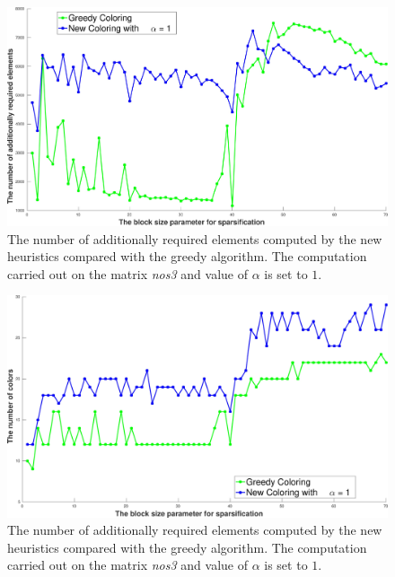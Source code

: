 \documentclass[12pt, oneside]{book}
\begin{document}
\begin{figure}
\centering
\includegraphics[width=0.9\linewidth]{bls_add_alpha_1_nos3}
\caption{The number of additionally required elements computed 
by the new heuristics compared with the 
greedy algorithm. The computation carried out on the matrix 
\textit{nos3} and value of $\alpha$ is 
set to $1$.}
\label{new.col.add.alpha.one.nos3}
\end{figure}
\begin{figure}
\centering
\includegraphics[width=0.9\linewidth]{bls_col_alpha_1_nos3}
\caption{The number of additionally required elements computed 
by the new heuristics compared with the greedy algorithm. 
The computation carried out on the matrix \textit{nos3} 
and value of $\alpha$ is set to $1$.}
\label{new.col.col.alpha.one.nos3}
\end{figure}
\end{document}

